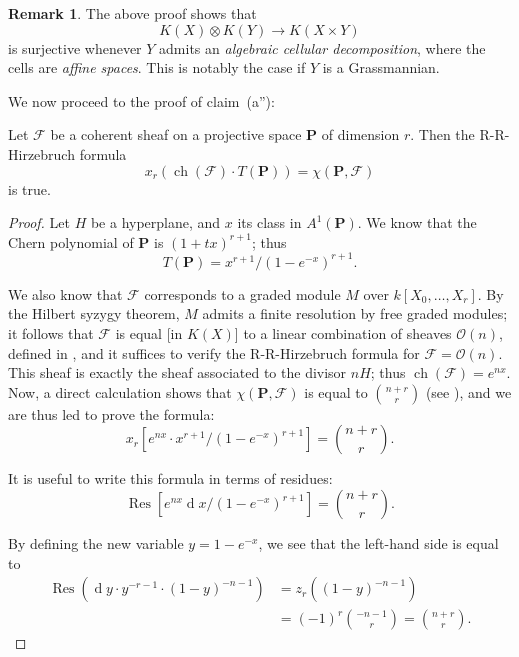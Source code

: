 \documentclass{article}
\theoremstyle{plain}
\newenvironment{proposition}[1]
    {\renewcommand\theinnercustomproposition{#1}\innercustomproposition}
    {\endinnercustomproposition}
\theoremstyle{definition}
\newtheorem*{remark}{Remark}
\newcommand{\sh}{\mathscr}
\newcommand{\PP}{\mathbf{P}}
\newcommand{\dd}{\operatorname{d}\!}
\DeclareMathOperator{\ch}{ch}
\newcommand{\oldpage}[1]{\marginpar{\footnotesize$\Big\vert$ \textit{p.~#1}}}
\begin{document}
\begin{remark}
  The above proof shows that
  \[
    K(X)\otimes K(Y) \to K(X\times Y)
  \]
  is surjective whenever $Y$ admits an \emph{algebraic cellular decomposition}, where the cells are \emph{affine spaces}.
  This is notably the case if $Y$ is a Grassmannian.
\end{remark}

We now proceed to the proof of claim~(a''):

\begin{proposition}{10}
\label{proposition10}
  Let $\sh{F}$ be a coherent sheaf on a projective space $\PP$
\oldpage{119}
  of dimension $r$.
  Then the R-R-Hirzebruch formula
  \[
    x_r(\ch(\sh{F})\cdot T(\PP)) = \chi(\PP,\sh{F})
  \]
  is true.
\end{proposition}

\begin{proof}
  Let $H$ be a hyperplane, and $x$ its class in $A^1(\PP)$.
  We know that the Chern polynomial of $\PP$ is $(1+tx)^{r+1}$;
  thus
  \[
    T(\PP) = x^{r+1}/(1-e^{-x})^{r+1}.
  \]

  We also know that $\sh{F}$ corresponds to a graded module $M$ over $k[X_0,\ldots,X_r]$.
  By the Hilbert syzygy theorem, $M$ admits a finite resolution by free graded modules;
  it follows that $\sh{F}$ is equal [in $K(X)$] to a linear combination of sheaves $\sh{O}(n)$, defined in \cite[p.~246]{12}, and it suffices to verify the R-R-Hirzebruch formula for $\sh{F}=\sh{O}(n)$.
  This sheaf is exactly the sheaf associated to the divisor $nH$;
  thus $\ch(\sh{F})=e^{nx}$.
  Now, a direct calculation shows that $\chi(\PP,\sh{F})$ is equal to $\binom{n+r}{r}$ (see \cite[p.~275]{12}), and we are thus led to prove the formula:
  \[
  \label{10equation*}
    x_r[e^{nx}\cdot x^{r+1}/(1-e^{-x})^{r+1}] = \binom{n+r}{r}.
    \tag{$\star$}
  \]

  It is useful to write this formula in terms of residues:
  \[
  \label{10equation**}
    \operatorname{Res}[e^{nx}\dd x/(1-e^{-x})^{r+1}] = \binom{n+r}{r}.
    \tag{$\star\star$}
  \]

  By defining the new variable $y=1-e^{-x}$, we see that the left-hand side is equal to
  \begin{align*}
    \operatorname{Res}(\dd y\cdot y^{-r-1}\cdot(1-y)^{-n-1})
    &= z_r((1-y)^{-n-1})
  \\&= (-1)^r\binom{-n-1}{r}
    = \binom{n+r}{r}.
  \end{align*}
\end{proof}
\end{document}
